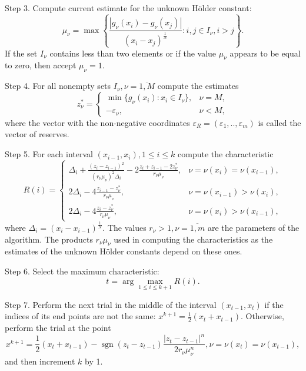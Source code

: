 \documentclass[runningheads]{llncs}
\begin{document}
Step 3. Compute current estimate for the unknown H\"{o}lder constant:
\begin{equation}
  \label{step2}
  \mu _{\nu }=\max \left\{ \frac{|g_{\nu }(x_{i})-g_{\nu }(x_{j})|}{(x_{i}-
x_{j})^{\frac{1}{N}}}:i,j\in I_{\nu },i>j \right\}.
\end{equation}
If the set \(I_{\nu }\) contains less than two elements or if the value \(\mu _{\nu }\) appears to
be equal to zero, then accept \(\mu _{\nu }=1\).

Step 4. For all nonempty sets \(I_{\nu },\nu ={\overline {1,M}}\) compute the estimates
\begin{equation}
  \label{eq:step_4}
  z_{\nu }^{*}={\begin{cases}\min\{g_{\nu }(x_{i}):x_{i}\in I_{\nu }\},&\nu =M,\\-\varepsilon
_{\nu },&\nu <M,\end{cases}}
\end{equation}
where the vector with the non-negative coordinates \(\varepsilon _{R}=(\varepsilon
_{1},..,\varepsilon _{m})\) is called the vector of reserves.

Step 5. For each interval \((x_{i-1},x_{i}),1\leqslant i\leqslant k\) compute the characteristic
\begin{equation}
  \label{step3_1}
  R(i)={\begin{cases}\Delta _{i}+{\frac {(z_{i}-z_{i-1})^{2}}{(r_{\nu }\mu _{\nu
})^{2}\Delta _{i}}}-2{\frac {z_{i}+z_{i-1}-2z_{\nu }^{*}}{r_{\nu }\mu _{\nu }}},&\nu =\nu
(x_{i})=\nu (x_{i-1}),\\2\Delta _{i}-4{\frac {z_{i-1}-z_{\nu }^{*}}{r_{\nu }\mu _{\nu
}}},&\nu =\nu (x_{i-1})>\nu (x_{i}),\\2\Delta _{i}-4{\frac {z_{i}-z_{\nu }^{*}}{r_{\nu }\mu
_{\nu }}},&\nu =\nu (x_{i})>\nu (x_{i-1}),\end{cases}}
\end{equation}
where \(\Delta_{i}=(x_{i}-x_{i-1})^{\frac{1}{N}}\).
The values \(r_{\nu }>1,\nu ={\overline {1,m}}\) are the parameters of the algorithm.
The products \(r_{\nu}\mu_{\nu}\) used in computing the characteristics as the estimates of the
unknown H\"{o}lder constants depend on these ones.

Step 6. Select the maximum characteristic:
\begin{equation}
\label{step4}
t=\arg \max_{1\leqslant i \leqslant k+1}R(i).
\end{equation}

Step 7. Perform the next trial in the middle of the interval \((x_{t-1},x_{t})\) if the indices of its
end points are not the same: \(x^{k+1}={\frac {1}{2}}(x_{t}+x_{t-1})\).
Otherwise, perform the trial at the point
\begin{displaymath}
  x^{k+1}={\frac {1}{2}}(x_{t}+x_{t-1})-\operatorname {sgn}(z_{t}-z_{t-1}){\frac {|z_{t}-
z_{t-1}|^{n}}{2r_{\nu }\mu _{\nu }^{n}}},\nu =\nu (x_{t})=\nu (x_{t-1}),
\end{displaymath}
and then increment \(k\) by 1.
\end{document}
